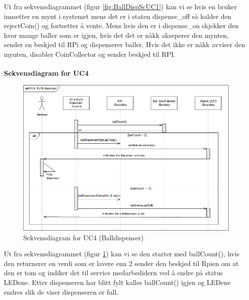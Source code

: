 \documentclass[Rapport/Rapport_main.tex]{subfiles}
\begin{document}
Ut fra sekvensdiagrammet (figur \ref{fig:BallDispScUC1}) kan vi se hvis en bruker innsetter en mynt i systemet mens det er i staten dispense\_off så kalder den rejectCoin() og fortsetter å vente. Mens hvis den er i dispense\_on skjekker den hvor mange baller som er igjen, hvis det det er nåkk akseperer den mynten, sender en beskjed til RPi og dispenserer baller. Hvis det ikke er nåkk avviser den mynten, disabler CoinCollector og sender beskjed til RPI.\\\\

\textbf{Sekvensdiagram for UC4}\\
\begin{figure}[H]
    \centering
    \includegraphics[width=\textwidth]{Arkitektur/Softwarearkitektur/Applikationsmodel/BallDispenser/graphicsBallDispenser/sdUC4.png}
    \caption{Sekvensdiagram for UC4 (Balldispenser)}
    \label{fig:BallDispScUC4}
\end{figure}

Ut fra sekvensdiagrammet (figur \ref{fig:BallDispScUC4}) kan vi se den starter med ballCount(), hvis den returnerer en verdi som er lavere enn 2 sender den beskjed til Rpien om at den er tom og indiker det til service medarbedidern ved å endre på status LEDene. Etter dispenseren har blitt fylt kalles ballCount() igjen og LEDene endres slik de viser dispenseren er full.
\end{document}

